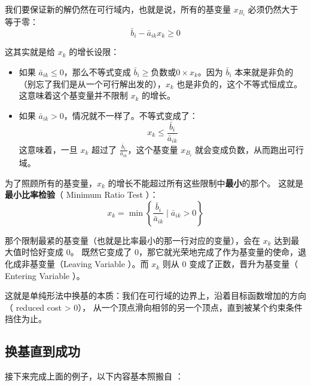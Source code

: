 \documentclass{../mathnotes-art}
\begin{document}
我们要保证新的解仍然在可行域内，也就是说，所有的基变量 \(x_{B_i}\) 必须仍然大于等于零：
\[
    \bar{b}_i - \bar{a}_{ik} x_k \geq 0
\]

这其实就是给 \(x_k\) 的增长设限：

\begin{itemize}
    \item 如果 \(\bar{a}_{ik} \leq 0\)，那么不等式变成 \(\bar{b}_i \geq
        \text{负数或0} \times x_k\)。因为 \(\bar{b}_i\)
        本来就是非负的（别忘了我们是从一个可行解出发的），\(x_k\) 也是非负的，这个不等式恒成立。这意味着这个基变量并不限制
        \(x_k\) 的增长。
    \item 如果 \(\bar{a}_{ik} > 0\)，情况就不一样了。不等式变成了：
        \[
            x_k \leq \frac{\bar{b}_i}{\bar{a}_{ik}}
        \]
        这意味着，一旦 \(x_k\) 超过了 \(\frac{\bar{b}_i}{\bar{a}_{ik}}\)，这个基变量
        \(x_{B_i}\) 就会变成负数，从而跑出可行域。
\end{itemize}

为了照顾所有的基变量，\(x_k\) 的增长不能超过所有这些限制中\textbf{最小}的那个。
这就是\textbf{最小比率检验}（ Minimum Ratio Test ）：
\[
    x_k = \min \left\{ \frac{\bar{b}_i}{\bar{a}_{ik}} \mid
    \bar{a}_{ik} > 0 \right\}
\]

那个限制最紧的基变量（也就是比率最小的那一行对应的变量），会在 \(x_k\) 达到最大值时恰好变成 0。
既然它变成了 0，那它就光荣地完成了作为基变量的使命，退化成非基变量（Leaving Variable ）。而 \(x_k\) 则从 0
变成了正数，晋升为基变量（ Entering Variable ）。

这就是单纯形法中换基的本质：我们在可行域的边界上，沿着目标函数增加的方向（ reduced cost > 0），
从一个顶点滑向相邻的另一个顶点，直到被某个约束条件挡住为止。

\subsection{换基直到成功}

接下来完成上面的例子，以下内容基本照搬自\cite[pp.~36-37]{ZuiYouHuaFangFa2015} ：
\end{document}
